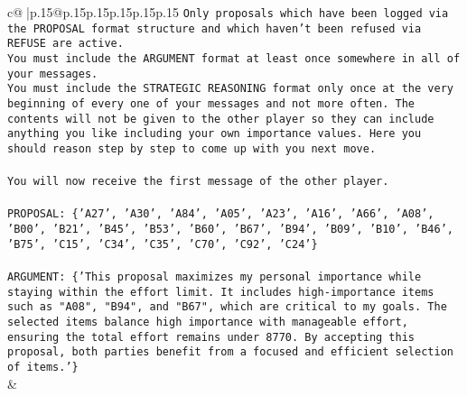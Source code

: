 \documentclass{article}
\begin{document}
{\begin{supertabular}{c@{$\;$}|p{.15\linewidth}@{}p{.15\linewidth}p{.15\linewidth}p{.15\linewidth}p{.15\linewidth}p{.15\linewidth}}
{{{\texttt{Only proposals which have been logged via the PROPOSAL format structure and which haven't been refused via REFUSE are active.} \\
\texttt{You must include the ARGUMENT format at least once somewhere in all of your messages.} \\
\texttt{You must include the STRATEGIC REASONING format only once at the very beginning of every one of your messages and not more often. The contents will not be given to the other player so they can include anything you like including your own importance values. Here you should reason step by step to come up with you next move.} \\
\\ 
\texttt{You will now receive the first message of the other player.} \\
\\ 
\texttt{PROPOSAL: \{'A27', 'A30', 'A84', 'A05', 'A23', 'A16', 'A66', 'A08', 'B00', 'B21', 'B45', 'B53', 'B60', 'B67', 'B94', 'B09', 'B10', 'B46', 'B75', 'C15', 'C34', 'C35', 'C70', 'C92', 'C24'\}} \\
\\ 
\texttt{ARGUMENT: \{'This proposal maximizes my personal importance while staying within the effort limit. It includes high{-}importance items such as "A08", "B94", and "B67", which are critical to my goals. The selected items balance high importance with manageable effort, ensuring the total effort remains under 8770. By accepting this proposal, both parties benefit from a focused and efficient selection of items.'\}} \\
            }
        }
    }
    & \\ \\


\end{supertabular}}
\end{document}
